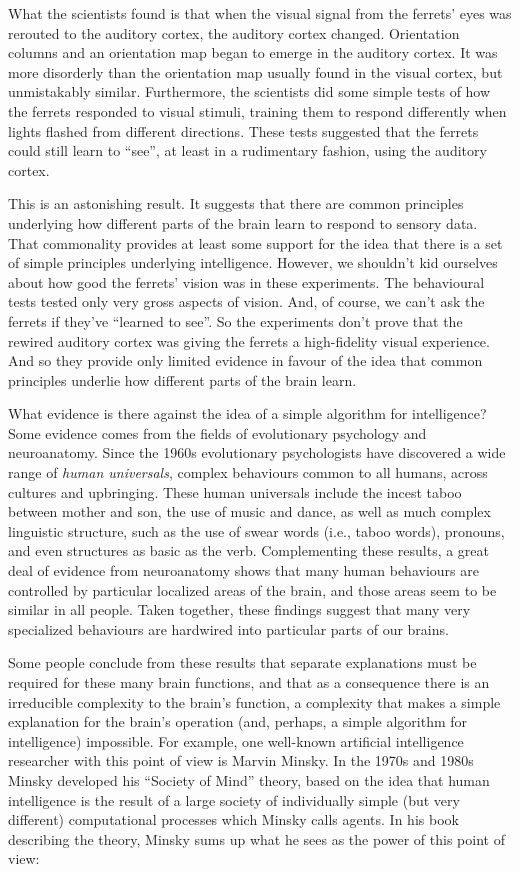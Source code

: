 What the scientists found is that when the visual signal from the ferrets' eyes was rerouted to the auditory cortex, the auditory cortex changed. Orientation columns and an orientation map began to emerge in the auditory cortex. It was more disorderly than the orientation map usually found in the visual cortex, but unmistakably similar. Furthermore, the scientists did some simple tests of how the ferrets responded to visual stimuli, training them to respond differently when lights flashed from different directions. These tests suggested that the ferrets could still learn to ``see'', at least in a rudimentary fashion, using the auditory cortex.


This is an astonishing result. It suggests that there are common principles underlying how different parts of the brain learn to respond to sensory data. That commonality provides at least some support for the idea that there is a set of simple principles underlying intelligence. However, we shouldn't kid ourselves about how good the ferrets' vision was in these experiments. The behavioural tests tested only very gross aspects of vision. And, of course, we can't ask the ferrets if they've ``learned to see''. So the experiments don't prove that the rewired auditory cortex was giving the ferrets a high-fidelity visual experience. And so they provide only limited evidence in favour of the idea that common principles underlie how different parts of the brain learn.


What evidence is there against the idea of a simple algorithm for intelligence? Some evidence comes from the fields of evolutionary psychology and neuroanatomy. Since the 1960s evolutionary psychologists have discovered a wide range of \emph{human universals}, complex behaviours common to all humans, across cultures and upbringing. These human universals include the incest taboo between mother and son, the use of music and dance, as well as much complex linguistic structure, such as the use of swear words (i.e., taboo words), pronouns, and even structures as basic as the verb. Complementing these results, a great deal of evidence from neuroanatomy shows that many human behaviours are controlled by particular localized areas of the brain, and those areas seem to be similar in all people. Taken together, these findings suggest that many very specialized behaviours are hardwired into particular parts of our brains.


Some people conclude from these results that separate explanations must be required for these many brain functions, and that as a consequence there is an irreducible complexity to the brain's function, a complexity that makes a simple explanation for the brain's operation (and, perhaps, a simple algorithm for intelligence) impossible. For example, one well-known artificial intelligence researcher with this point of view is Marvin Minsky. In the 1970s and 1980s Minsky developed his ``Society of Mind'' theory, based on the idea that human intelligence is the result of a large society of individually simple (but very different) computational processes which Minsky calls agents. In his book describing the theory, Minsky sums up what he sees as the power of this point of view:



